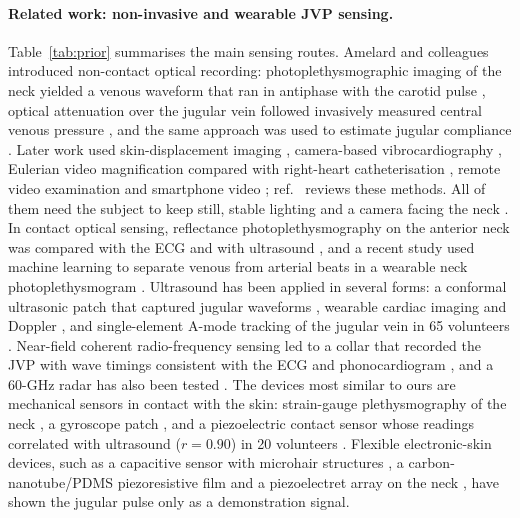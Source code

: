 \documentclass[11pt]{article}
\begin{document}
\paragraph{Related work: non-invasive and wearable JVP sensing.}
Table~\ref{tab:prior} summarises the main sensing routes. Amelard and colleagues introduced non-contact optical recording: photoplethysmographic imaging of the neck yielded a venous waveform that ran in antiphase with the carotid pulse \cite{amelard2017noncontact}, optical attenuation over the jugular vein followed invasively measured central venous pressure \cite{amelard2021optical}, and the same approach was used to estimate jugular compliance \cite{amelard2022assessing}. Later work used skin-displacement imaging \cite{lampotang2018noncontact}, camera-based vibrocardiography \cite{moco2017camera,moco2018importance}, Eulerian video magnification compared with right-heart catheterisation \cite{abnousi2019novel}, remote video examination \cite{kelly2020feasibility} and smartphone video \cite{farahani2025noncontact}; ref.~\cite{arrow2023capturing} reviews these methods. All of them need the subject to keep still, stable lighting and a camera facing the neck \cite{saiko2024observation}. In contact optical sensing, reflectance photoplethysmography on the anterior neck was compared with the ECG and with ultrasound \cite{garcialopez2020extracting,garcialopez2020characterization}, and a recent study used machine learning to separate venous from arterial beats in a wearable neck photoplethysmogram \cite{cao2026unmixing}. Ultrasound has been applied in several forms: a conformal ultrasonic patch that captured jugular waveforms \cite{wang2018monitoring}, wearable cardiac imaging and Doppler \cite{hu2023wearable,sempionatto2021epidermal,wang2021flexible,kenny2021novel}, and single-element A-mode tracking of the jugular vein in 65 volunteers \cite{george2022high,george2025single,sahani2016carotid}. Near-field coherent radio-frequency sensing \cite{hui2018monitoring} led to a collar that recorded the JVP with wave timings consistent with the ECG and phonocardiogram \cite{conroy2023jugular}, and a 60-GHz radar has also been tested \cite{das2025feasibility}. The devices most similar to ours are mechanical sensors in contact with the skin: strain-gauge plethysmography of the neck \cite{proto2021plethysmography,menegatti2022effect}, a gyroscope patch \cite{karhinoja2023method}, and a piezoelectric contact sensor whose readings correlated with ultrasound ($r=0.90$) in 20 volunteers \cite{george2024jugular}. Flexible electronic-skin devices, such as a capacitive sensor with microhair structures \cite{pang2015highly}, a carbon-nanotube/PDMS piezoresistive film \cite{tai2015flexible} and a piezoelectret array on the neck \cite{han2022mapping}, have shown the jugular pulse only as a demonstration signal.
\end{document}
